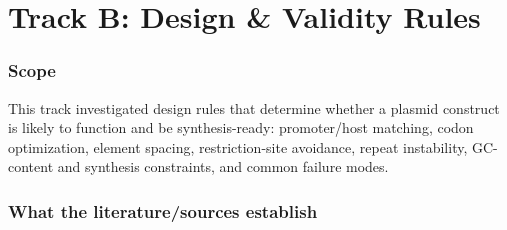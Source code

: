 \documentclass[11pt]{report}
\begin{document}
\chapter{Track B: Design \& Validity Rules}

\subsection{Scope}
This track investigated design rules that determine whether a plasmid construct is likely to function and be synthesis-ready: promoter/host matching, codon optimization, element spacing, restriction-site avoidance, repeat instability, GC-content and synthesis constraints, and common failure modes.\par

\subsection{What the literature/sources establish}
\end{document}
